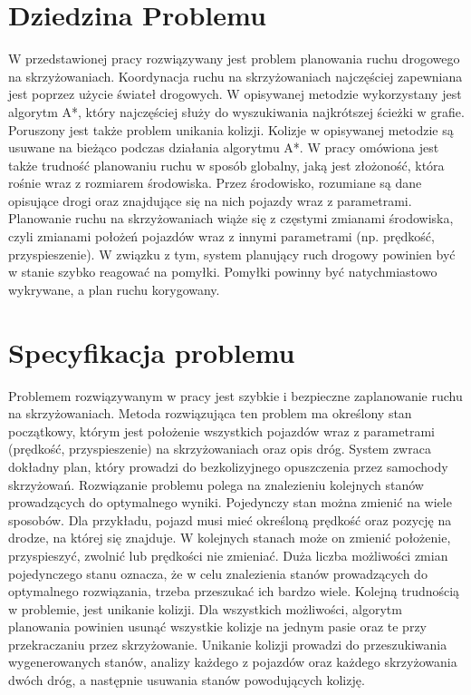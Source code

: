 
\section{Dziedzina Problemu}

W przedstawionej pracy rozwiązywany jest problem planowania ruchu drogowego na skrzyżowaniach. Koordynacja ruchu na skrzyżowaniach najczęściej zapewniana jest poprzez użycie świateł drogowych. W opisywanej metodzie wykorzystany jest algorytm A*, który najczęściej służy do wyszukiwania najkrótszej ścieżki w grafie. Poruszony jest także problem unikania kolizji. Kolizje w opisywanej metodzie są usuwane na bieżąco podczas działania algorytmu A*.
\newline
\indent
W pracy omówiona jest także trudność planowaniu ruchu w sposób globalny, jaką jest złożoność, która rośnie wraz z rozmiarem środowiska. Przez środowisko, rozumiane są dane opisujące drogi oraz znajdujące się na nich pojazdy wraz z parametrami. Planowanie ruchu na skrzyżowaniach wiąże się z częstymi zmianami środowiska, czyli zmianami położeń pojazdów wraz z innymi parametrami (np. prędkość, przyspieszenie). W związku z tym, system planujący ruch drogowy powinien być w stanie szybko reagować na pomyłki. Pomyłki powinny być natychmiastowo wykrywane, a plan ruchu korygowany.

\section{Specyfikacja problemu}

Problemem rozwiązywanym w pracy jest szybkie i bezpieczne zaplanowanie ruchu na skrzyżowaniach. Metoda rozwiązująca ten problem ma określony stan początkowy, którym jest położenie wszystkich pojazdów wraz z parametrami (prędkość, przyspieszenie) na skrzyżowaniach oraz opis dróg. System zwraca dokładny plan, który prowadzi do bezkolizyjnego opuszczenia przez samochody skrzyżowań. Rozwiązanie problemu polega na znalezieniu kolejnych stanów prowadzących do optymalnego wyniki. Pojedynczy stan można zmienić na wiele sposobów. Dla przykładu, pojazd musi mieć określoną prędkość oraz pozycję na drodze, na której się znajduje. W kolejnych stanach może on zmienić położenie, przyspieszyć, zwolnić lub prędkości nie zmieniać. Duża liczba możliwości zmian pojedynczego stanu oznacza, że w celu znalezienia stanów prowadzących do optymalnego rozwiązania, trzeba przeszukać ich bardzo wiele.
\newline
\indent
Kolejną trudnością w problemie, jest unikanie kolizji. Dla wszystkich możliwości, algorytm planowania powinien usunąć wszystkie kolizje na jednym pasie oraz te przy przekraczaniu przez skrzyżowanie. Unikanie kolizji prowadzi do przeszukiwania wygenerowanych stanów, analizy każdego z pojazdów oraz każdego skrzyżowania dwóch dróg, a następnie usuwania stanów powodujących kolizję.

